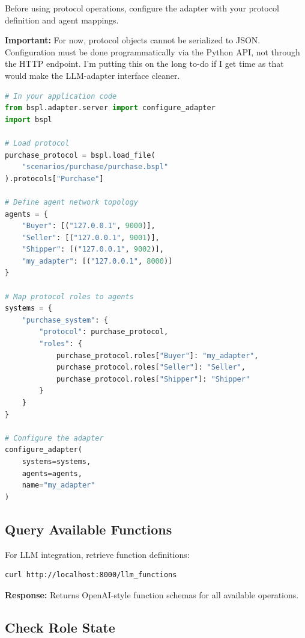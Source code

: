 \documentclass[11pt,a4paper]{article}
\begin{document}
Before using protocol operations, configure the adapter with your protocol definition and agent mappings.

\begin{tcolorbox}[colback=blue!5,colframe=blue!40!black,title=Configuration Requirements]
\textbf{Important:} For now, protocol objects cannot be serialized to JSON. Configuration must be done programmatically via the Python API, not through the HTTP endpoint. I'm putting this on the long to-do if I get time as that would make the LLM-adapter interface cleaner.
\end{tcolorbox}

\begin{lstlisting}[language=Python]
# In your application code
from bspl.adapter.server import configure_adapter
import bspl

# Load protocol
purchase_protocol = bspl.load_file(
    "scenarios/purchase/purchase.bspl"
).protocols["Purchase"]

# Define agent network topology
agents = {
    "Buyer": [("127.0.0.1", 9000)],
    "Seller": [("127.0.0.1", 9001)],
    "Shipper": [("127.0.0.1", 9002)],
    "my_adapter": [("127.0.0.1", 8000)]
}

# Map protocol roles to agents
systems = {
    "purchase_system": {
        "protocol": purchase_protocol,
        "roles": {
            purchase_protocol.roles["Buyer"]: "my_adapter",
            purchase_protocol.roles["Seller"]: "Seller",
            purchase_protocol.roles["Shipper"]: "Shipper"
        }
    }
}

# Configure the adapter
configure_adapter(
    systems=systems,
    agents=agents,
    name="my_adapter"
)
\end{lstlisting}

\subsection{Query Available Functions}

For LLM integration, retrieve function definitions:

\begin{lstlisting}[language=bash]
curl http://localhost:8000/llm_functions
\end{lstlisting}

\textbf{Response:} Returns OpenAI-style function schemas for all available operations.

\subsection{Check Role State}
\end{document}
